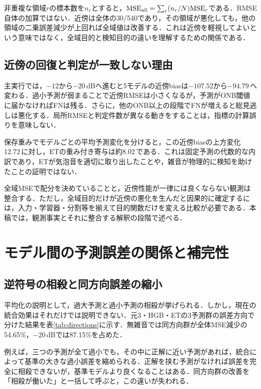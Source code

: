 非重複な領域$r$の標本数を$n_r$とすると，$\mathrm{MSE}_{\rm all}=\sum_r(n_r/N)\mathrm{MSE}_r$である．RMSE自体の加算ではない．近傍は全体の30/540であり，その領域が悪化しても，他の領域の二乗誤差減少が上回れば全域値は改善する．これは近傍を軽視してよいという意味ではなく，全域目的と検知目的の違いを理解するための関係である．

\subsection{近傍の回復と判定が一致しない理由}
主実行では，$-12$から$-20$\,dBへ進むと5モデルの近傍biasは$-107.52$から$-94.79$\,\kw{}へ変わる．過小予測が弱まることで近傍RMSEは小さくなるが，予測がONB閾値に届かなければFNは残る．さらに，他のONB以上の段階でFNが増えると総見逃しは悪化する．局所RMSEと判定件数が異なる動きをすることは，指標の計算誤りを意味しない．

保存重みでモデルごとの平均予測変化を分けると，この近傍biasの上方変化12.72\,\kw{}に対し，ETの重み付き寄与は約8.02\,\kw{}である\cite{localMainRun}．これは固定予測の代数的な内訳であり，ETが気泡音を適切に取り出したことや，雑音が物理的に検知を助けたことの証明ではない．

全域MSEで配分を決めていることと，近傍性能が一律には良くならない観測は整合する．ただし，全域目的だけが近傍の悪化を生んだと因果的に確定するには，入力・学習器・分割等を揃えて目的関数だけを変える比較が必要である．本稿では，観測事実とそれに整合する解釈の段階で述べる．

\section{モデル間の予測誤差の関係と補完性}
\subsection{逆符号の相殺と同方向誤差の縮小}
平均化の説明として，過大予測と過小予測の相殺が挙げられる．しかし，現在の統合効果はそれだけでは説明できない．元3・HGB・ETの3予測群の誤差方向で分けた結果を表\ref{tab:directions}に示す．無雑音では同方向群が全体MSE減少の54.65\%，$-20$\,dBでは87.15\%を占めた．
\begin{table}[htbp]
\centering\small
\caption{元3・HGB・ETの3予測群による誤差方向別の全体MSE減少への寄与．MSE寄与の単位は\mseunit{}．}
\label{tab:directions}

\end{table}

例えば，三つの予測が全て過小でも，その中に正解に近い予測があれば，統合によって基準の大きな過小誤差を縮められる．正解を挟む予測がなければ誤差を完全に相殺できないが，基準モデルより良くなることはある．同方向群の改善を「相殺が働いた」と一括して呼ぶと，この違いが失われる．

